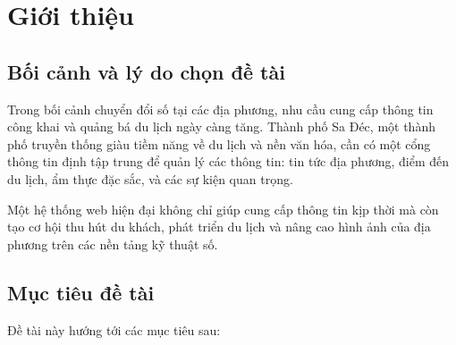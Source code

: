 \documentclass[12pt,a4paper,oneside]{report}
\begin{document}
% 

\tableofcontents
\listoffigures
\listoftables
\newpage


\chapter{Giới thiệu}

\section{Bối cảnh và lý do chọn đề tài}

Trong bối cảnh chuyển đổi số tại các địa phương, nhu cầu cung cấp thông tin công khai và quảng bá du lịch ngày càng tăng.
Thành phố Sa Đéc, một thành phố truyền thống giàu tiềm năng về du lịch và nền văn hóa, cần có một cổng thông tin định tập trung
để quản lý các thông tin: tin tức địa phương, điểm đến du lịch, ẩm thực đặc sắc, và các sự kiện quan trọng.

Một hệ thống web hiện đại không chỉ giúp cung cấp thông tin kịp thời mà còn tạo cơ hội thu hút du khách, phát triển du lịch
và nâng cao hình ảnh của địa phương trên các nền tảng kỹ thuật số.

\section{Mục tiêu đề tài}

Đề tài này hướng tới các mục tiêu sau:
\end{document}
